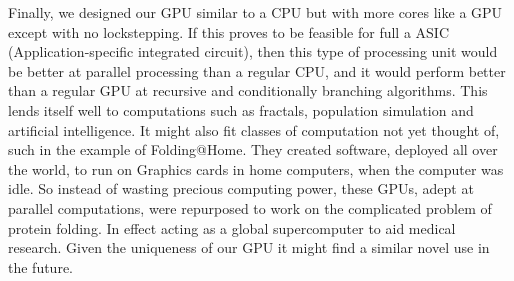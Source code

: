 		Finally, we designed our GPU similar to a CPU but with more	cores like a
		GPU except with no lockstepping. If this proves to be feasible for full
		a ASIC (Application-specific integrated circuit), then this type of
		processing unit would be better at parallel processing than a regular
		CPU, and it would perform better than a regular GPU at recursive and
		conditionally branching algorithms. This lends itself well to
		computations such as fractals, population simulation and artificial
		intelligence. It might also fit classes of computation not yet thought
		of, such in the example of Folding@Home\cite{Beberg2009}. They created
		software, deployed all over the world, to run on Graphics cards in home
		computers, when the computer was idle. So instead of wasting precious
		computing power, these GPUs, adept at parallel computations, were
		repurposed to work on the complicated problem of protein folding. In
		effect acting as a global supercomputer to aid medical research. Given
		the uniqueness of our GPU it might find a similar novel use in the
		future.
